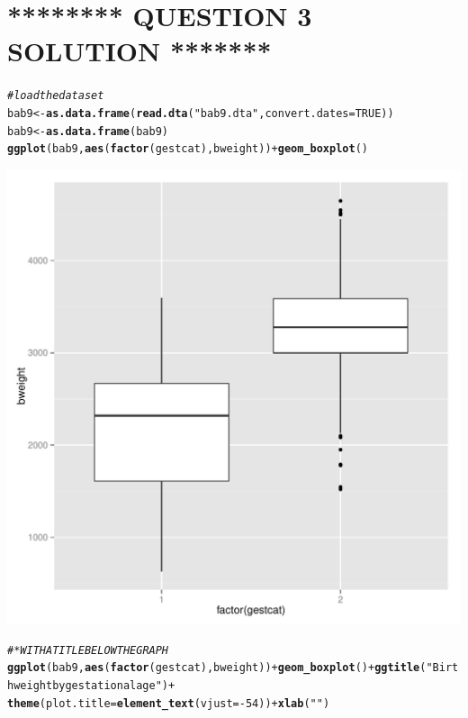 \documentclass[DIV=calc, paper=a4, fontsize=11pt]{scrartcl}\usepackage[]{graphicx}\usepackage[]{color}
\makeatletter
\def\maxwidth{ %
  \ifdim\Gin@nat@width>\linewidth
    \linewidth
  \else
    \Gin@nat@width
  \fi
}
\newcommand{\hlnum}[1]{\textcolor[rgb]{0.686,0.059,0.569}{#1}}%
\newcommand{\hlstr}[1]{\textcolor[rgb]{0.192,0.494,0.8}{#1}}%
\newcommand{\hlcom}[1]{\textcolor[rgb]{0.678,0.584,0.686}{\textit{#1}}}%
\newcommand{\hlopt}[1]{\textcolor[rgb]{0,0,0}{#1}}%
\newcommand{\hlstd}[1]{\textcolor[rgb]{0.345,0.345,0.345}{#1}}%
\newcommand{\hlkwb}[1]{\textcolor[rgb]{0.69,0.353,0.396}{#1}}%
\newcommand{\hlkwc}[1]{\textcolor[rgb]{0.333,0.667,0.333}{#1}}%
\newcommand{\hlkwd}[1]{\textcolor[rgb]{0.737,0.353,0.396}{\textbf{#1}}}%
\newenvironment{kframe}{%
 \def\at@end@of@kframe{}%
 \ifinner\ifhmode%
  \def\at@end@of@kframe{\end{minipage}}%
  \begin{minipage}{\columnwidth}%
 \fi\fi%
 \def\FrameCommand##1{\hskip\@totalleftmargin \hskip-\fboxsep
 \colorbox{shadecolor}{##1}\hskip-\fboxsep
     \hskip-\linewidth \hskip-\@totalleftmargin \hskip\columnwidth}%
 \MakeFramed {\advance\hsize-\width
   \@totalleftmargin\z@ \linewidth\hsize
   \@setminipage}}%
 {\par\unskip\endMakeFramed%
 \at@end@of@kframe}
\newenvironment{knitrout}{}{} %
\makeatother
\begin{document}
\section*{******** QUESTION 3 SOLUTION *******}
\begin{knitrout}
\color{fgcolor}\begin{kframe}
\begin{alltt}
\hlcom{# load the data set}
\hlstd{bab9} \hlkwb{<-} \hlkwd{as.data.frame}\hlstd{(}\hlkwd{read.dta}\hlstd{(}\hlstr{"bab9.dta"}\hlstd{,} \hlkwc{convert.dates} \hlstd{=} \hlnum{TRUE}\hlstd{))}
\hlstd{bab9} \hlkwb{<-} \hlkwd{as.data.frame}\hlstd{(bab9)}
\hlkwd{ggplot}\hlstd{(bab9,} \hlkwd{aes}\hlstd{(}\hlkwd{factor}\hlstd{(gestcat), bweight))} \hlopt{+} \hlkwd{geom_boxplot}\hlstd{()}
\end{alltt}
\end{kframe}
\includegraphics[width=\maxwidth]{figure/unnamed-chunk-31} 
\begin{kframe}\begin{alltt}
\hlcom{# *WITH A TITLE BELOW THE GRAPH}
\hlkwd{ggplot}\hlstd{(bab9,} \hlkwd{aes}\hlstd{(}\hlkwd{factor}\hlstd{(gestcat), bweight))} \hlopt{+} \hlkwd{geom_boxplot}\hlstd{()} \hlopt{+} \hlkwd{ggtitle}\hlstd{(}\hlstr{"Birth weight by gestational age"}\hlstd{)} \hlopt{+}
    \hlkwd{theme}\hlstd{(}\hlkwc{plot.title} \hlstd{=} \hlkwd{element_text}\hlstd{(}\hlkwc{vjust} \hlstd{=} \hlopt{-}\hlnum{54}\hlstd{))} \hlopt{+} \hlkwd{xlab}\hlstd{(}\hlstr{""}\hlstd{)}

\end{alltt}
\end{kframe}
\end{knitrout}
\end{document}
